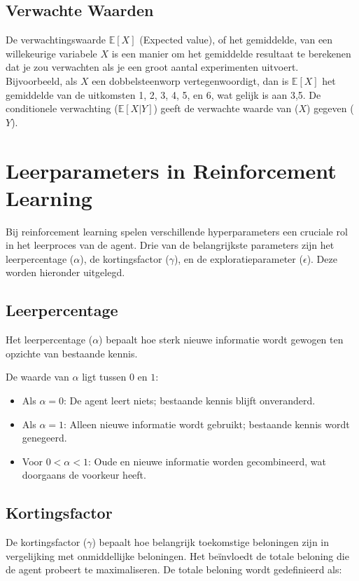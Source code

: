 \documentclass[a4paper,12pt]{report}
\begin{document}
\subsection{Verwachte Waarden}
De verwachtingswaarde \(\mathbb{E}[X]\) (Expected value), of het gemiddelde,
van een willekeurige variabele \(X\) is een manier om het gemiddelde resultaat
te berekenen dat je zou verwachten als je een groot aantal experimenten
uitvoert. Bijvoorbeeld, als \(X\) een dobbelsteenworp vertegenwoordigt, dan is
\(\mathbb{E}[X]\) het gemiddelde van de uitkomsten 1, 2, 3, 4, 5, en 6, wat
gelijk is aan 3,5. De conditionele verwachting (\(\mathbb{E}[X|Y]\)) geeft de
verwachte waarde van (\(X\)) gegeven (\(Y\)).

\section{Leerparameters in Reinforcement Learning}

Bij reinforcement learning spelen verschillende hyperparameters een cruciale
rol in het leerproces van de agent. Drie van de belangrijkste parameters zijn
het leerpercentage (\(\alpha\)), de kortingsfactor (\(\gamma\)), en de
exploratieparameter (\(\epsilon\)). Deze worden hieronder uitgelegd.

\subsection{Leerpercentage}

Het leerpercentage (\(\alpha\)) bepaalt hoe sterk nieuwe informatie wordt
gewogen ten opzichte van bestaande kennis.

De waarde van \(\alpha\) ligt tussen \(0\) en \(1\):
\begin{itemize}
    \item Als \(\alpha = 0\): De agent leert niets; bestaande kennis blijft onveranderd.
    \item Als \(\alpha = 1\): Alleen nieuwe informatie wordt gebruikt; bestaande kennis
          wordt genegeerd.
    \item Voor \(0 < \alpha < 1\): Oude en nieuwe informatie worden gecombineerd, wat
          doorgaans de voorkeur heeft.
\end{itemize}

\subsection{Kortingsfactor}

De kortingsfactor (\(\gamma\)) bepaalt hoe belangrijk toekomstige beloningen
zijn in vergelijking met onmiddellijke beloningen. Het beïnvloedt de totale
beloning die de agent probeert te maximaliseren. De totale beloning wordt
gedefinieerd als:
\end{document}
